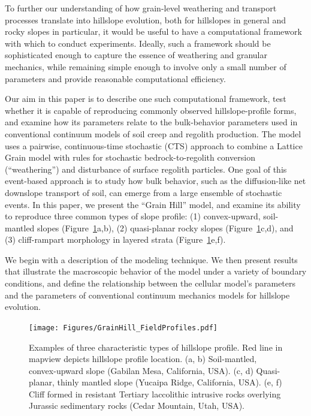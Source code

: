 \documentclass[esurf, manuscript]{copernicus}
\begin{document}
To further our understanding of how grain-level weathering and transport processes translate into hillslope evolution, both for hillslopes in general and rocky slopes in particular, it would be useful to have a computational framework with which to conduct experiments. Ideally, such a framework should be sophisticated enough to capture the essence of weathering and granular mechanics, while remaining simple enough to involve only a small number of parameters and provide reasonable computational efficiency.

Our aim in this paper is to describe one such computational framework, test whether it is capable of reproducing commonly observed hillslope-profile forms, and examine how its parameters relate to the bulk-behavior parameters used in conventional continuum models of soil creep and regolith production. The model uses a pairwise, continuous-time stochastic (CTS) approach to combine a Lattice Grain model with rules for stochastic bedrock-to-regolith conversion (``weathering'') and disturbance of surface regolith particles. One goal of this event-based approach is to study how bulk behavior, such as the diffusion-like net downslope transport of soil, can emerge from a large ensemble of  stochastic events. In this paper, we present the ``Grain Hill'' model, and examine its ability to reproduce three common types of slope profile: (1) convex-upward, soil-mantled slopes (Figure~\ref{threeslopes}a,b), (2) quasi-planar rocky slopes (Figure~\ref{threeslopes}c,d), and (3) cliff-rampart morphology in layered strata (Figure~\ref{threeslopes}e,f).

We begin with a description of the modeling technique. We then present results that illustrate the macroscopic behavior of the model under a variety of boundary conditions, and define the relationship between the cellular model's parameters and the parameters of conventional continuum mechanics models for hillslope evolution.

\begin{figure}[t]
\texttt{[image: Figures/GrainHill\_FieldProfiles.pdf]}
\caption{Examples of three characteristic types of hillslope profile. Red line in mapview depicts hillslope profile location. (a, b) Soil-mantled, convex-upward slope (Gabilan Mesa, California, USA). (c, d) Quasi-planar, thinly mantled slope (Yucaipa Ridge, California, USA). (e, f) Cliff formed in resistant Tertiary laccolithic intrusive rocks overlying Jurassic sedimentary rocks (Cedar Mountain, Utah, USA).}
\label{threeslopes}
\end{figure}
\end{document}
